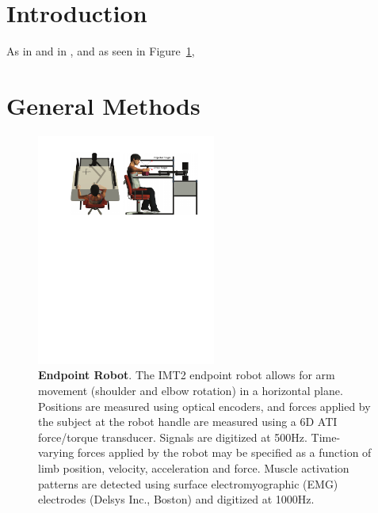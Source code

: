 \documentclass[12pt]{article}
\begin{document}
  
\section*{Introduction}

As in \cite{mattar2005motor} and in \cite{hodgkin1952propagation},
and as seen in Figure~\ref{fig:robot}, \lipsum[1-5]

\section*{General Methods}

\lipsum[1-5]

\newpage




\newpage
\clearpage
\begin{figure}[H]
	\centering
        \includegraphics[height=3in]{robot_imt.pdf}
        \caption{\textbf{Endpoint Robot}. The IMT2 endpoint robot
          allows for arm movement (shoulder and elbow rotation) in a
          horizontal plane. Positions are measured using optical
          encoders, and forces applied by the subject at the robot
          handle are measured using a 6D ATI force/torque
          transducer. Signals are digitized at 500Hz. Time-varying
          forces applied by the robot may be specified as a function
          of limb position, velocity, acceleration and force. Muscle
          activation patterns are detected using surface
          electromyographic (EMG) electrodes (Delsys Inc., Boston) and
          digitized at 1000Hz.}
 \label{fig:robot}
\end{figure}


\end{document}
